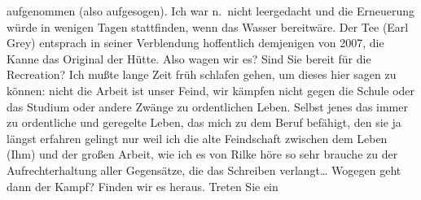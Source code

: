 \documentclass[
]{article}
\begin{document}
aufgenommen (also aufgesogen). Ich war n.~nicht leergedacht und die
Erneuerung würde in wenigen Tagen stattfinden, wenn das Wasser
bereitwäre. Der Tee (Earl Grey) entsprach in seiner Verblendung
hoffentlich demjenigen von 2007, die Kanne das Original der Hütte. Also
wagen wir es? Sind Sie bereit für die Recreation? Ich mußte lange Zeit
früh schlafen gehen, um dieses hier sagen zu können: nicht die Arbeit
ist unser Feind, wir kämpfen nicht gegen die Schule oder das Studium
oder andere Zwänge zu ordentlichen Leben. Selbst jenes das immer zu
ordentliche und geregelte Leben, das mich zu dem Beruf befähigt, den sie
ja längst erfahren gelingt nur weil ich die alte Feindschaft zwischen
dem Leben (Ihm) und der großen Arbeit, wie ich es von Rilke höre so sehr
brauche zu der Aufrechterhaltung aller Gegensätze, die das Schreiben
verlangt\ldots{} Wogegen geht dann der Kampf? Finden wir es heraus.
Treten Sie ein
\end{document}

